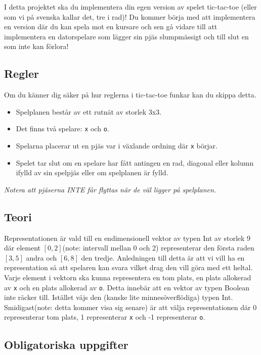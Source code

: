 
I detta projektet ska du implementera din egen version av spelet tic-tac-toe (eller som vi på svenska kallar det, tre i rad)! Du kommer börja med att implementera en version där du kan spela mot en kursare och sen gå vidare till att implementera en datorspelare som lägger sin pjäs slumpmässigt och till slut en som inte kan förlora!

\subsection{Regler}
Om du känner dig säker på hur reglerna i tic-tac-toe funkar kan du skippa detta. 
\begin{itemize}
	\item Spelplanen består av ett rutnät av storlek 3x3.
	\item Det finns två spelare: \texttt{x} och \texttt{o}.
	\item Spelarna placerar ut en pjäs var i växlande ordning där \texttt{x} börjar.
	\item Spelet tar slut om en spelare har fått antingen en rad, diagonal eller kolumn ifylld av sin spelpjäs eller om spelplanen är fylld.
\end{itemize}
\textit{Notera att pjäserna INTE får flyttas när de väl ligger på spelplanen.}

\subsection{Teori}
Representationen är vald till en endimensionell vektor av typen Int av storlek 9 där element $[0,2]$(note: intervall mellan 0 och 2) representerar den första raden $[3,5]$ andra och $[6,8]$ den tredje. Anledningen till detta är att vi vill ha en representation så att spelaren kan svara vilket drag den vill göra med ett heltal.
Varje element i vektorn ska kunna representera en tom plats, en plats allokerad av \texttt{x} och en plats allokerad av \texttt{o}. Detta innebär att en vektor av typen Boolean inte räcker till. Istället väjs den (kanske lite minnesöverflödiga) typen Int. Smidigast(note: detta kommer visa sig senare) är att välja representationen där 0 representerar tom plats, 1 representerar \texttt{x} och -1 representerar \texttt{o}. 
 
\subsection{Obligatoriska uppgifter}


